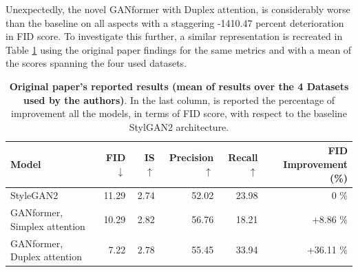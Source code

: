 \documentclass{article}
\begin{document}
	Unexpectedly, the novel GANformer with Duplex attention, is considerably worse than the baseline on all aspects with a staggering -1410.47 percent deterioration in FID score.
	To investigate this further, a similar representation is recreated in Table \ref{tab:orig-results} using 
	the original paper findings for the same metrics and with a mean of the scores spanning the four 
	used datasets.
	\begin{table}[htb]
    	\centering
        \caption{\textbf{Original paper's reported results (mean of results over the 4 Datasets used by the 
        authors)}. In the last column, is reported the percentage of improvement all the models, in terms 
        of FID score, with respect to the baseline StylGAN2 architecture.}
        \label{tab:orig-results}
        \vspace{3mm}
        \small
        \begin{tabular}{l|rrrrr}
	        \toprule
	        Model           & FID  $\downarrow$ & IS $\uparrow$& Precision $\uparrow$ & Recall 
	        $\uparrow$& {FID Improvement (\%)}\\ 
	        \midrule
	        StyleGAN2                    & 11.29 & 2.74 & 52.02      & 23.98 & 0 \% \\ 
	        {GANformer, Simplex attention} & 10.29 & 2.82   & 56.76     & 18.21  & 
	        +8.86 \% \\ 
	        {GANformer, Duplex attention}  & 7.22   & 2.78 & 55.45     & 33.94 & +36.11 \%
	        \\ 
	        \bottomrule
        \end{tabular}
        \end{table}
	
\end{document}
